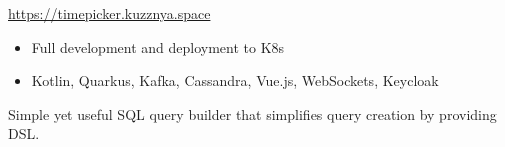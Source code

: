 \documentclass[10pt,a4paper,ragged2e,withhyper]{altacv}
\begin{document}
\begin{paracol}{2}

\url{https://timepicker.kuzznya.space}\\

\begin{itemize}
\item Full development and deployment to K8s
\item Kotlin, Quarkus, Kafka, Cassandra, Vue.js, WebSockets, Keycloak
\end{itemize}

\divider


Simple yet useful SQL query builder that simplifies query creation by providing DSL.


\end{paracol}
\end{document}
